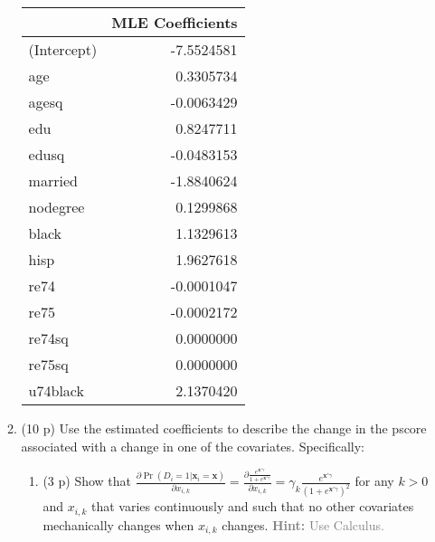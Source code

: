 \documentclass[
]{article}
\newenvironment{Shaded}{\begin{snugshade}}{\end{snugshade}}
\newcommand{\AttributeTok}[1]{\textcolor[rgb]{0.13,0.29,0.53}{#1}}
\newcommand{\FunctionTok}[1]{\textcolor[rgb]{0.13,0.29,0.53}{\textbf{#1}}}
\newcommand{\NormalTok}[1]{#1}
\newcommand{\OtherTok}[1]{\textcolor[rgb]{0.56,0.35,0.01}{#1}}
\newcommand{\SpecialCharTok}[1]{\textcolor[rgb]{0.81,0.36,0.00}{\textbf{#1}}}
\newcommand{\StringTok}[1]{\textcolor[rgb]{0.31,0.60,0.02}{#1}}
\begin{document}
\begin{enumerate}
\begin{enumerate}
\begin{Shaded}
\end{Shaded}

    \newpage

    \begin{longtable}[]{@{}lr@{}}
    \toprule\noalign{}
    & MLE Coefficients \\
    \midrule\noalign{}
    \endhead
    \bottomrule\noalign{}
    \endlastfoot
    (Intercept) & -7.5524581 \\
    age & 0.3305734 \\
    agesq & -0.0063429 \\
    edu & 0.8247711 \\
    edusq & -0.0483153 \\
    married & -1.8840624 \\
    nodegree & 0.1299868 \\
    black & 1.1329613 \\
    hisp & 1.9627618 \\
    re74 & -0.0001047 \\
    re75 & -0.0002172 \\
    re74sq & 0.0000000 \\
    re75sq & 0.0000000 \\
    u74black & 2.1370420 \\
    \end{longtable}
  \item
    (10 p) Use the estimated coefficients to describe the change in the
    pscore associated with a change in one of the covariates.
    Specifically:

    \begin{enumerate}
    \def\labelenumiii{\roman{enumiii}.}
    \item
      (3 p) Show that
      \(\frac{\partial \Pr(D_i=1|\mathbf{x}_{i}=\mathbf{x})}{\partial x_{i,k}}=\frac{\partial \frac{e^{\mathbf{x}'\gamma}}{1+ e^{\mathbf{x}'\gamma}}}{\partial x_{i,k}}= \gamma_k \frac{e^{\mathbf{x}'\gamma}}{(1+e^{\mathbf{x}'\gamma})^2}\)
      for any \(k >0\) and \(x_{i,k}\) that varies continuously and such
      that no other covariates mechanically changes when \(x_{i,k}\)
      changes.
      \textcolor{gray}{\textbf{Hint:} Use Calculus.}\label{item:logit:partial}


\end{enumerate}
\end{enumerate}
\end{enumerate}
\end{document}
